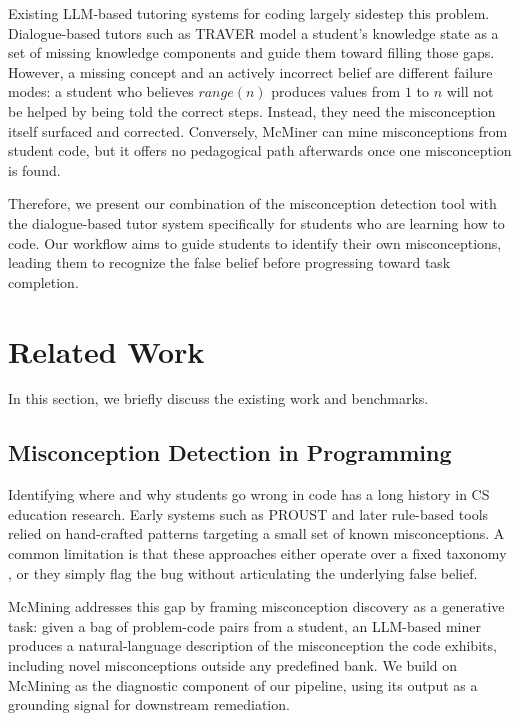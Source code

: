 \documentclass[11pt]{article}
\begin{document}
Existing LLM-based tutoring systems for coding largely sidestep this problem. Dialogue-based tutors such as TRAVER \cite{wang2025training} model a student's knowledge state as a set of missing knowledge components and guide them toward filling those gaps. However, a missing concept and an actively incorrect belief are different failure modes: a student who believes $range(n)$ produces values from $1$ to $n$ will not be helped by being told the correct steps. Instead, they need the misconception itself surfaced and corrected. Conversely, McMiner \cite{al-hossami-bunescu-2026-mcmining} can mine misconceptions from student code, but it offers no pedagogical path afterwards once one misconception is found.

Therefore, we present our combination of the misconception detection tool \cite{al-hossami-bunescu-2026-mcmining} with the dialogue-based tutor system \cite{wang2025training} specifically for students who are learning how to code. Our workflow aims to guide students to identify their own misconceptions, leading them to recognize the false belief before progressing toward task completion.



\section{Related Work}
In this section, we briefly discuss the existing work and benchmarks.
\subsection{Misconception Detection in Programming}
Identifying where and why students go wrong in code has a long history in CS education research. Early systems such as PROUST \cite{10.5555/800054.801994} and later rule-based tools relied on hand-crafted patterns targeting a small set of known misconceptions. A common limitation is that these approaches either operate over a fixed taxonomy \cite{10.1145/2994154}, or they simply flag the bug without articulating the underlying false belief. 

McMining addresses this gap by framing misconception discovery as a generative task: given a bag of problem-code pairs from a student, an LLM-based miner produces a natural-language description of the misconception the code exhibits, including novel misconceptions outside any predefined bank. We build on McMining as the diagnostic component of our pipeline, using its output as a grounding signal for downstream remediation.
\end{document}
